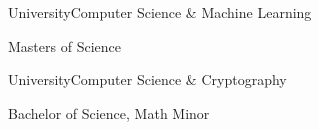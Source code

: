 \documentclass{article}
\newenvironment{*mylist}[2]{
  \subsection*{#1}
  \small
  \begin{list}{}{}
   \setlength{\topsep}{0pt}
   \setlength{\itemsep}{1pt}
   \setlength{\parskip}{0pt}
   \setlength{\parsep}{0pt}
 \item {\bf #2}
}{\end{list}\normalsize}
\newcommand{\LUx}[1]{{\bf\em #1}}
\begin{document}
\begin{comment}
\item \href{https://github.com/probinso/adarailz}{AdaRailz Concurrent Model Train Control System}\hfill\LUx{Ada}
\item TwixT AI Agent \& UI\hfill\LUx{Java}
\item Image Manipulation Program \hfill\LUx{C\#}
\item Unix Shell \hfill\LUx{C}
\end{**mylist}
\normalsize
\end{comment}

\BSec{}%

\begin{multicols}{2}

  \begin{*mylist}{ University}{Computer Science \& Machine Learning}
  \item Masters of Science %
\end{*mylist}\columnbreak

  \raggedright
  \begin{*mylist}{ University}{Computer Science \& Cryptography}
  \item Bachelor of Science, Math Minor %
  \end{*mylist}
\end{multicols}
\end{document}
